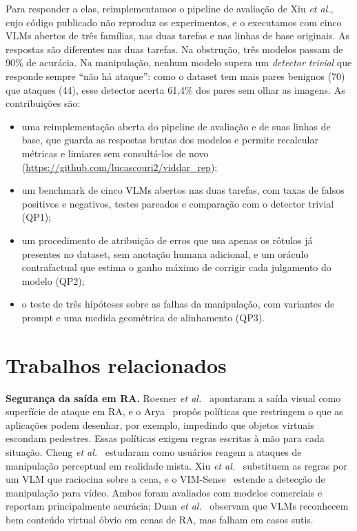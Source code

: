 \documentclass[conference]{IEEEtran}
\begin{document}
Para responder a elas, reimplementamos o pipeline de avaliação de Xiu \emph{et al.}, cujo código
publicado não reproduz os experimentos, e o executamos com cinco VLMs abertos de três famílias, nas duas
tarefas e nas linhas de base originais. As respostas são diferentes nas duas tarefas. Na obstrução,
três modelos passam de 90\% de acurácia. Na manipulação, nenhum modelo supera um \emph{detector trivial}
que responde sempre ``não há ataque'': como o dataset tem mais pares benignos (70) que ataques (44), esse
detector acerta 61,4\% dos pares sem olhar as imagens. As contribuições são:
\begin{itemize}
\item uma reimplementação aberta do pipeline de avaliação e de suas linhas de base, que guarda as
  respostas brutas dos modelos e permite recalcular métricas e limiares sem consultá-los de novo
  (\url{https://github.com/lucascouri2/viddar_rep});
\item um benchmark de cinco VLMs abertos nas duas tarefas, com taxas de falsos positivos e negativos,
  testes pareados e comparação com o detector trivial (QP1);
\item um procedimento de atribuição de erros que usa apenas os rótulos já presentes no dataset, sem
  anotação humana adicional, e um oráculo contrafactual que estima o ganho máximo de corrigir cada
  julgamento do modelo (QP2);
\item o teste de três hipóteses sobre as falhas da manipulação, com variantes de prompt e uma medida
  geométrica de alinhamento (QP3).
\end{itemize}

\section{Trabalhos relacionados}
\label{sec:rel}

\textbf{Segurança da saída em RA.} Roesner \emph{et al.}~\cite{roesner2014} apontaram a saída visual
como superfície de ataque em RA, e o Arya~\cite{arya} propôs políticas que restringem o que as aplicações
podem desenhar, por exemplo, impedindo que objetos virtuais escondam pedestres. Essas políticas exigem
regras escritas à mão para cada situação. Cheng \emph{et al.}~\cite{cheng2023} estudaram como usuários
reagem a ataques de manipulação perceptual em realidade mista. Xiu \emph{et al.}~\cite{viddar}
substituem as regras por um VLM que raciocina sobre a cena, e o VIM-Sense~\cite{vimsense} estende a
detecção de manipulação para vídeo. Ambos foram avaliados com modelos comerciais e reportam
principalmente acurácia; Duan \emph{et al.}~\cite{duan2025} observam que VLMs reconhecem bem conteúdo
virtual óbvio em cenas de RA, mas falham em casos sutis.
\end{document}
